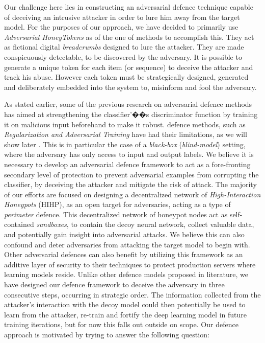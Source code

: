 \documentclass[grad,lot,lof,11pt,oneside,onehalfspace]{RUthesis}
\begin{document}
  Our challenge here lies in constructing an adversarial defence technique capable of deceiving an intrusive attacker in order to lure him away from the target model. For the purposes of our approach, we have decided to primarily use \textit{Adversarial HoneyTokens} as of the one of methods to accomplish this. They act as fictional digital \textit{breadcrumbs} designed to lure the attacker. They are made conspicuously detectable, to be discovered by the adversary. It is possible to generate a unique token for each item (or sequence) to deceive the attacker and track his abuse. However each token must be strategically designed, generated and deliberately embedded into the system to,  misinform and fool the adversary.
  
  As  stated earlier, some of the previous research on adversarial defence methods has aimed at strengthening the classifier'��s discriminator function by training it on malicious input beforehand to make it robust. defence methods, such as \textit{Regularization and Adversarial Training} have had their limitations, as we will show later \cite{rozsa_towards_2016}.  This is in particular  the case of a \emph{black-box} (\emph{blind-model}) setting, where the adversary has only access to input and output labels. We believe it is necessary to develop an adversarial defence framework to act as a fore-fronting secondary level of protection to prevent adversarial examples from corrupting the classifier, by deceiving the attacker and mitigate the risk of attack. The majority of our efforts are focused on designing a decentralized network of\textit{ High-Interaction Honeypots} (HIHP), as an open target for adversaries, acting as a type of \textit{perimeter} defence. This decentralized network of honeypot nodes act as self-contained \textit{sandboxes}, to contain the decoy neural network, collect valuable data, and potentially gain insight into adversarial attacks. We believe this can also confound and deter adversaries from attacking the target model to begin with. Other adversarial defences can also benefit by utilizing this framework as an additive layer of security to their techniques to protect production servers where learning models reside. Unlike other defence models proposed in literature,  we have designed our defence framework to deceive the adversary in three consecutive steps, occurring in strategic order. The information collected from the attacker's interaction with the decoy model could then potentially be used to learn from the attacker, re-train and fortify the deep learning model in future training iterations, but for now this falls out outside on scope. Our defence approach is motivated by trying to answer the following question:
 
\end{document}

